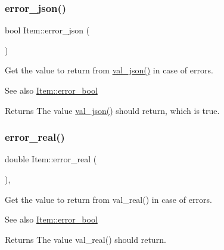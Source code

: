 \subsubsection{\texorpdfstring{error\+\_\+json()}{error\_json()}}
{\footnotesize\ttfamily bool Item\+::error\+\_\+json (\begin{DoxyParamCaption}{ }\end{DoxyParamCaption})\hspace{0.3cm}{\ttfamily [inline]}}

Get the value to return from \mbox{\hyperlink{classItem_a57e763fcde2d0a819d21e31c59611290}{val\+\_\+json()}} in case of errors.

\begin{DoxySeeAlso}{See also}
\mbox{\hyperlink{classItem_a45c8c303465b71321c15ae43583de83f}{Item\+::error\+\_\+bool}}
\end{DoxySeeAlso}
\begin{DoxyReturn}{Returns}
The value \mbox{\hyperlink{classItem_a57e763fcde2d0a819d21e31c59611290}{val\+\_\+json()}} should return, which is true. 
\end{DoxyReturn}
\mbox{\label{classItem_a1d0cb18fac534ad707a5d2842832d6d0}} 
\subsubsection{\texorpdfstring{error\+\_\+real()}{error\_real()}}
{\footnotesize\ttfamily double Item\+::error\+\_\+real (\begin{DoxyParamCaption}{ }\end{DoxyParamCaption})\hspace{0.3cm}{\ttfamily [inline]}, {\ttfamily [protected]}}

Get the value to return from val\+\_\+real() in case of errors.

\begin{DoxySeeAlso}{See also}
\mbox{\hyperlink{classItem_a45c8c303465b71321c15ae43583de83f}{Item\+::error\+\_\+bool}}
\end{DoxySeeAlso}
\begin{DoxyReturn}{Returns}
The value val\+\_\+real() should return. 
\end{DoxyReturn}
\mbox{\label{classItem_ac16fa7082ec39db85fceb3a37459fd7d}} 
